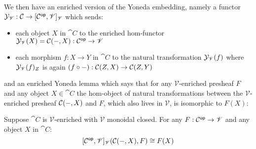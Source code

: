 \noindent We then have an enriched version of the Yoneda embedding, namely a functor $\mathcal{Y}_{\mathscr{V}}:
\mathcal{C} \to [\mathcal{C}^{\mathsf{op}},\mathscr{V}]_{\mathscr{V}}$ which sends:

\begin{itemize}
\item each object $X$ in $\cat{C}$ to the enriched hom-functor $\mathcal{Y}_{\mathscr{V}}(X) =
{\mathcal{C}}(-,X): \mathcal{C}^{\mathsf{op}} \to \mathscr{V}$
\item each morphism $f: X \to Y$ in $\cat{C}$ to the natural transformation $\mathcal{Y}_{\mathscr{V}}(f)$ where
$\mathcal{Y}_{\mathscr{V}}(f)_Z$ is again $(f \circ -): {\mathcal{C}}(Z,X) \to {\mathcal{C}}(Z,Y)$
\end{itemize}

\noindent and an enriched Yoneda lemma which says that for any $\mathscr{V}$-enriched presheaf $F$ and any
object $X \in \cat{C}$ the hom-object of natural transformations between the $\mathscr{V}$-enriched presheaf
${\mathcal{C}}(-,X)$ and $F$, which also lives in $\mathscr{V}$, is isomorphic to $F(X)$:

\begin{lemma}
Suppose $\cat{C}$ is $\mathscr{V}$-enriched with $\mathscr{V}$ monoidal closed. For any $F: \mathcal{C}^{\mathsf{op}} \to
\mathscr{V}$ and any object $X$ in $\cat{C}$:
\[{[\mathcal{C}^{\mathsf{op}},\mathscr{V}]_{\mathscr{V}}}({\mathcal{C}}(-,X),F) \cong F(X)\]
\end{lemma}

